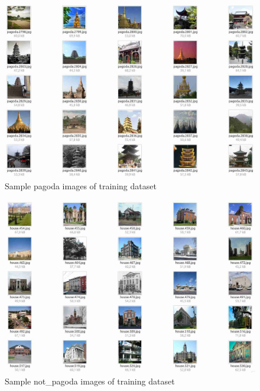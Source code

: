 \begin{figure}[H]
\centering
\includegraphics[width=1\textwidth]{images/sample.jpg}
\caption{Sample pagoda images of training dataset}
\label{fig:samplepagoda}
\end{figure}

\begin{figure}[H]
\centering
\includegraphics[width=1\textwidth]{images/sample2.jpg}
\caption{Sample not\_pagoda images of training dataset}
\label{fig:samplenotpagoda}
\end{figure}



